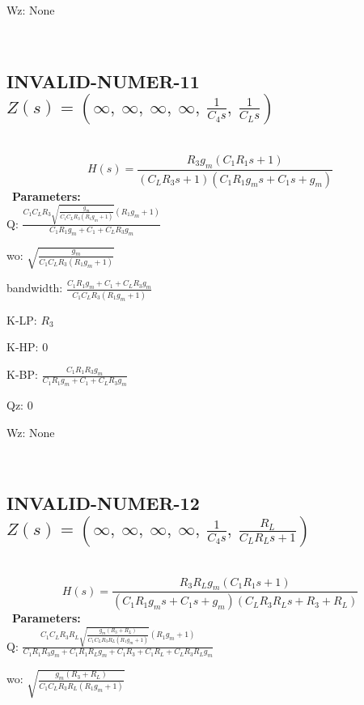 \documentclass{article}
\begin{document}
Wz: $\text{None}$\ 

\ 

\subsection{INVALID-NUMER-11 $Z(s) = \left( \infty, \  \infty, \  \infty, \  \infty, \  \frac{1}{C_{4} s}, \  \frac{1}{C_{L} s}\right)$ } \ 
\textbf{\[H(s) = \frac{R_{3} g_{m} \left(C_{1} R_{1} s + 1\right)}{\left(C_{L} R_{3} s + 1\right) \left(C_{1} R_{1} g_{m} s + C_{1} s + g_{m}\right)}\] } \ 
\textbf{Parameters:}\\ 

Q: $\frac{C_{1} C_{L} R_{3} \sqrt{\frac{g_{m}}{C_{1} C_{L} R_{3} \left(R_{1} g_{m} + 1\right)}} \left(R_{1} g_{m} + 1\right)}{C_{1} R_{1} g_{m} + C_{1} + C_{L} R_{3} g_{m}}$\ 

wo: $\sqrt{\frac{g_{m}}{C_{1} C_{L} R_{3} \left(R_{1} g_{m} + 1\right)}}$\ 

bandwidth: $\frac{C_{1} R_{1} g_{m} + C_{1} + C_{L} R_{3} g_{m}}{C_{1} C_{L} R_{3} \left(R_{1} g_{m} + 1\right)}$\ 

K-LP: $R_{3}$\ 

K-HP: $0$\ 

K-BP: $\frac{C_{1} R_{1} R_{3} g_{m}}{C_{1} R_{1} g_{m} + C_{1} + C_{L} R_{3} g_{m}}$\ 

Qz: $0$\ 

Wz: $\text{None}$\ 

\ 

\subsection{INVALID-NUMER-12 $Z(s) = \left( \infty, \  \infty, \  \infty, \  \infty, \  \frac{1}{C_{4} s}, \  \frac{R_{L}}{C_{L} R_{L} s + 1}\right)$ } \ 
\textbf{\[H(s) = \frac{R_{3} R_{L} g_{m} \left(C_{1} R_{1} s + 1\right)}{\left(C_{1} R_{1} g_{m} s + C_{1} s + g_{m}\right) \left(C_{L} R_{3} R_{L} s + R_{3} + R_{L}\right)}\] } \ 
\textbf{Parameters:}\\ 

Q: $\frac{C_{1} C_{L} R_{3} R_{L} \sqrt{\frac{g_{m} \left(R_{3} + R_{L}\right)}{C_{1} C_{L} R_{3} R_{L} \left(R_{1} g_{m} + 1\right)}} \left(R_{1} g_{m} + 1\right)}{C_{1} R_{1} R_{3} g_{m} + C_{1} R_{1} R_{L} g_{m} + C_{1} R_{3} + C_{1} R_{L} + C_{L} R_{3} R_{L} g_{m}}$\ 

wo: $\sqrt{\frac{g_{m} \left(R_{3} + R_{L}\right)}{C_{1} C_{L} R_{3} R_{L} \left(R_{1} g_{m} + 1\right)}}$\ 
\end{document}

